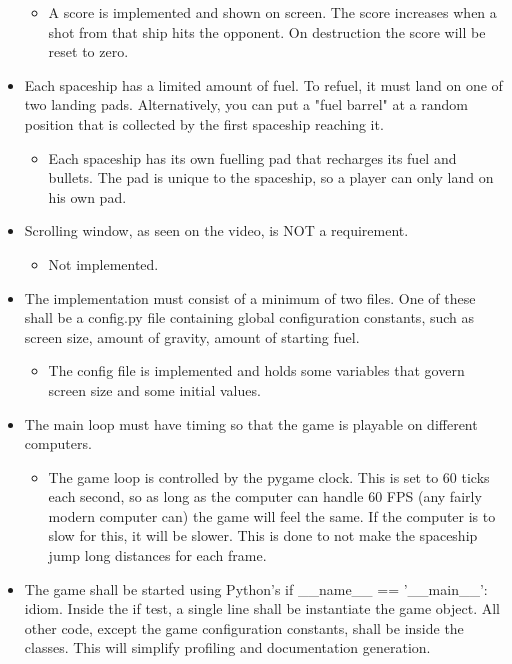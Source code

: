\documentclass{article}
\begin{document}
\begin{itemize}
	\begin{itemize}
		\item A score is implemented and shown on screen. The score increases when a shot from that ship hits the opponent. On destruction the score will be reset to zero.
	\end{itemize}
	\item  Each spaceship has a limited amount of fuel. To refuel, it must land on one of two landing pads. Alternatively, you can put a "fuel barrel" at a random position that is collected by the first spaceship reaching it.
	\begin{itemize}
		\item Each spaceship has its own fuelling pad that recharges its fuel and bullets. The pad is unique to the spaceship, so a player can only land on his own pad.
	\end{itemize}
	\item Scrolling window, as seen on the video, is NOT a requirement.
	\begin{itemize}
		\item Not implemented.
	\end{itemize}
	\item The implementation must consist of a minimum of two files. One of these shall be a config.py file containing global configuration constants, such as screen size, amount of gravity, amount of starting fuel.
	\begin{itemize}
		\item The config file is implemented and holds some variables that govern screen size and some initial values.
	\end{itemize}
	\item The main loop must have timing so that the game is playable on different computers.
	\begin{itemize}
		\item The game loop is controlled by the pygame clock. This is set to 60 ticks each second, so as long as the computer can handle 60 FPS (any fairly modern computer can) the game will feel the same. If the computer is to slow for this, it will be slower. This is done to not make the spaceship jump long distances for each frame.
	\end{itemize}
	\item The game shall be started using Python's if \_\_name\_\_ == '\_\_main\_\_': idiom. Inside the if test, a single line shall be instantiate the game object. All other code, except the game configuration constants, shall be inside the classes. This will simplify profiling and documentation generation.

\end{itemize}
\end{document}
